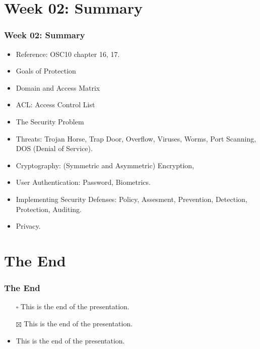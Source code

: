\documentclass[aspectratio=169, xcolor=table, notheorems, hyperref={pdfpagelabels=false}]{beamer}
\begin{document}
\section{Week 02: Summary}
\begin{frame}
\frametitle{Week 02: Summary}
\begin{itemize}
\item Reference: OSC10 chapter 16, 17.
\item Goals of Protection
\item Domain and Access Matrix
\item ACL: Access Control List
\item The Security Problem
\item Threats: Trojan Horse, Trap Door, Overflow, Viruses, Worms, Port Scanning, 
      DOS (Denial of Service).
\item Cryptography: (Symmetric and Asymmetric) Encryption,
\item User Authentication: Password, Biometrics.
\item Implementing Security Defenses: Policy, Assesment, Prevention, Detection, Protection, Auditing.
\item Privacy.
\end{itemize}
\end{frame}

\section{The End}
\begin{frame}
\frametitle{The End}
\begin{itemize}
\item[$\square$] This is the end of the presentation.
\item[$\boxtimes$] This is the end of the presentation.
\item This is the end of the presentation.
\end{itemize}
\begin{table}
\end{table}
\end{frame}

\end{document}

